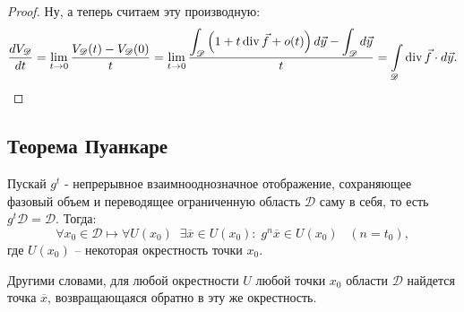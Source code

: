 \begin{proof}
		Ну, а теперь считаем эту производную:
		\begin{equation*}
			\frac{dV_\mathscr{D}}{dt} = \lim\limits_{t \rightarrow 0} \frac{V_\mathscr{D}(t) - 	V_\mathscr{D}(0)}{t} = \lim\limits_{t \rightarrow 0} \dfrac{\displaystyle \int_{\mathscr{D}} \left(1 + t\operatorname{div}\vec{f} + o(t)\right) d\vec{y} - \int_{\mathscr{D}} d\vec{y}}{t} = \int\limits_{\mathscr{D}} \operatorname{div}\vec{f}\cdot d\vec{y}.
		\end{equation*}
	\end{proof}

	\subsection{Теорема Пуанкаре}
	\begin{theorem}	
		Пускай $g^t$ - непрерывное взаимнооднозначное отображение, сохраняющее фазовый объем и переводящее ограниченную область $\mathscr{D}$ саму в себя, то есть $g^t\mathscr{D} = \mathscr{D}$. Тогда:
		\begin{equation*}
			\forall x_0 \in \mathscr{D} \longmapsto \forall U(x_0) \;\; \exists \overline{x} \in U(x_0):\; g^n \overline{x} \in U(x_0) \;\;\; (n = t_0),
		\end{equation*}
		где $U(x_0)$ -- некоторая окрестность точки $x_0$.
		
		Другими словами, для любой окрестности $U$ любой точки $x_0$ области $\mathscr{D}$ найдется точка $\overline{x}$, возвращающаяся обратно в эту же окрестность.
	\end{theorem}
